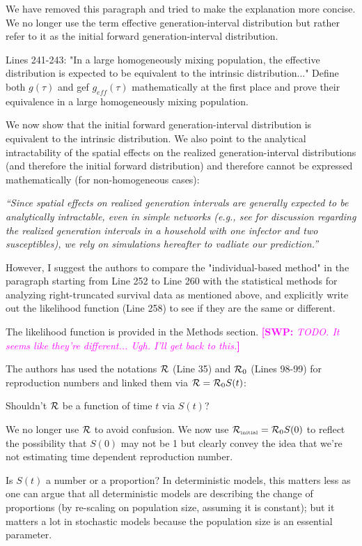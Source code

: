 \documentclass[12pt]{article}
\newcommand{\RR}{\ensuremath{{\cal R}}}
\newcommand{\Rx}[1]{\ensuremath{{\cal R}_{#1}}}
\newcommand{\Ro}{\Rx{0}}
\newcommand{\Rini}{\Rx{\textrm{\tiny initial}}}
\newcommand{\revtext}{\textsf}
\newcommand{\newtext}[1]{\textsl{``#1''}}
\newcommand{\comment}[3]{\textcolor{#1}{\textbf{[#2: }\textsl{#3}\textbf{]}}}
\newcommand{\swp}[1]{\comment{magenta}{SWP}{#1}}
\begin{document}
We have removed this paragraph and tried to make the explanation more concise.
We no longer use the term effective generation-interval distribution but rather refer to it as the initial forward generation-interval distribution.

\revtext{Lines 241-243: "In a large homogeneously mixing population, the effective
distribution is expected to be equivalent to the intrinsic distribution..."
Define both $g(\tau)$ and gef $g_{eff}(\tau)$ mathematically at the first place and prove
their equivalence in a large homogeneously mixing population.}

We now show that the initial forward generation-interval distribution is equivalent to the intrinsic distribution.
We also point to the analytical intractability of the spatial effects on the realized generation-interval distributions (and therefore the initial forward distribution) and therefore cannot be expressed mathematically (for non-homogeneous cases):

\newtext{Since spatial effects on realized generation intervals are generally expected to be analytically intractable, even in simple networks (e.g., see \cite{tomba2010some} for discussion regarding the realized generation intervals in a household with one infector and two susceptibles), we rely on simulations hereafter to vadliate our prediction.}

\revtext{However, I suggest the authors to compare the "individual-based
method" in the paragraph starting from Line 252 to Line 260 with the statistical methods for analyzing right-truncated survival data as mentioned
above, and explicitly write out the likelihood function (Line 258) to see if
they are the same or different.}

The likelihood function is provided in the Methods section.
\swp{TODO. It seems like they're different... Ugh. I'll get back to this.}

\revtext{The authors has used the notations $\RR$ (Line 35) and $\Ro$ (Lines 98-99) for reproduction numbers and
linked them via $\RR = \Ro S(t)$:}

\revtext{Shouldn't $\RR$ be a function of time $t$ via $S(t)$?}

We no longer use $\RR$ to avoid confusion. We now use $\Rini = \Ro S(0)$ to reflect the possibility that $S(0)$ may not be 1 but clearly convey the idea that we're not estimating time dependent reproduction number.

\revtext{Is $S(t)$ a number or a proportion? In deterministic models, this matters
less as one can argue that all deterministic models are describing the
change of proportions (by re-scaling on population size, assuming it is
constant); but it matters a lot in stochastic models because the population
size is an essential parameter.}
\end{document}

